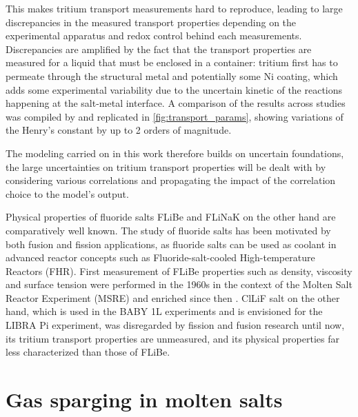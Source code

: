 \documentclass[a4paper,11pt,oneside]{report}
\begin{document}
This makes tritium transport measurements hard to reproduce, leading to large discrepancies in the measured transport properties depending on the experimental apparatus and redox control behind each measurements\cite{anderl_deuteriumtritium_2004,saraswat_permeation_2026}. Discrepancies are amplified by the fact that the transport properties are measured for a liquid that must be enclosed in a container: tritium first has to permeate through the structural metal and potentially some Ni coating, which adds some experimental variability due to the uncertain kinetic of the reactions happening at the salt-metal interface\cite{fukada_diffusion_2005}. A comparison of the results across studies was compiled by \textcite{humrickhouse_tritium_2020} and replicated in \cref{fig:transport_params}, showing variations of the Henry's constant by up to 2 orders of magnitude. 

The modeling carried on in this work therefore builds on uncertain foundations, the large uncertainties on tritium transport properties will be dealt with by considering various correlations and propagating the impact of the correlation choice to the model's output. 

Physical properties of fluoride salts FLiBe and FLiNaK on the other hand are comparatively well known. The study of fluoride salts has been motivated by both fusion and fission applications, as fluoride salts can be used as coolant in advanced reactor concepts such as Fluoride-salt-cooled High-temperature Reactors (FHR)\cite{stempien_integrated_2016}. First measurement of FLiBe properties such as density, viscosity and surface tension were performed in the 1960s in the context of the Molten Salt Reactor Experiment (MSRE)\cite{cantor_physical_1968} and enriched since then \cite{romatoski_fluoride_2017,vidrio_density_2022}. ClLiF salt on the other hand, which is used in the BABY 1L experiments\cite{delaporte-mathurin_baby_2026} and is envisioned for the LIBRA Pi experiment, was disregarded by fission and fusion research until now, its tritium transport properties are unmeasured, and its physical properties far less characterized
than those of FLiBe. 

\section{Gas sparging in molten salts}
\end{document}
